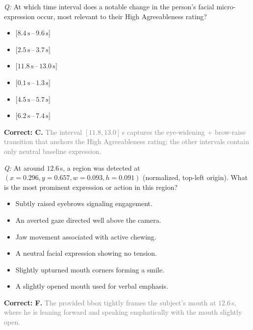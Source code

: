 \documentclass{article}
\begin{document}
\begin{examplebox}[title={(5) Micro-expression Localization}]
\emph{Q:} At which time interval does a notable change in the person's facial micro-expression occur, most relevant to their High Agreeableness rating?
\begin{itemize}[leftmargin=1.4em, itemsep=0pt, topsep=1pt, parsep=0pt]
\item[A.] $[8.4\,\text{s}\,$--$\,9.6\,\text{s}]$
\item[B.] $[2.5\,\text{s}\,$--$\,3.7\,\text{s}]$
\item[C.] $[11.8\,\text{s}\,$--$\,13.0\,\text{s}]$
\item[D.] $[0.1\,\text{s}\,$--$\,1.3\,\text{s}]$
\item[E.] $[4.5\,\text{s}\,$--$\,5.7\,\text{s}]$
\item[F.] $[6.2\,\text{s}\,$--$\,7.4\,\text{s}]$
\end{itemize}
\textcolor{humanc}{\textbf{Correct: C.}} \textcolor{gray}{ The interval $[11.8, 13.0]$\,s captures the eye-widening + brow-raise transition that anchors the High Agreeableness rating; the other intervals contain only neutral baseline expression.}

\end{examplebox}
\begin{examplebox}[title={(6) Spatial Localization Verification}]
\emph{Q:} At around $12.6$\,s, a region was detected at $(x{=}0.296, y{=}0.657, w{=}0.093, h{=}0.091)$ (normalized, top-left origin). What is the most prominent expression or action in this region?
\begin{itemize}[leftmargin=1.4em, itemsep=0pt, topsep=1pt, parsep=0pt]
\item[A.] Subtly raised eyebrows signaling engagement.
\item[B.] An averted gaze directed well above the camera.
\item[C.] Jaw movement associated with active chewing.
\item[D.] A neutral facial expression showing no tension.
\item[E.] Slightly upturned mouth corners forming a smile.
\item[F.] A slightly opened mouth used for verbal emphasis.
\end{itemize}
\textcolor{humanc}{\textbf{Correct: F.}} \textcolor{gray}{ The provided bbox tightly frames the subject's mouth at $12.6$\,s, where he is leaning forward and speaking emphatically with the mouth slightly open.}

\end{examplebox}
\end{document}
